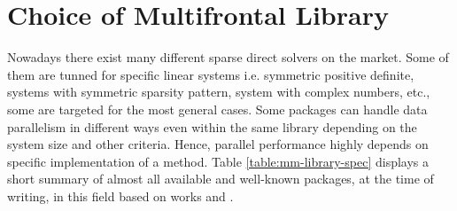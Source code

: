 \section{Choice of Multifrontal Library}
\label{subseq:mm-library-choice}



Nowadays there exist many different sparse direct solvers on the market. Some of them are tunned for specific linear systems i.e. symmetric positive definite, systems with symmetric sparsity pattern, system with complex numbers, etc., some are targeted for the most general cases. Some packages can handle data parallelism in different ways even within the same library depending on the system size and other criteria. Hence, parallel performance highly depends on specific implementation of a method. Table \ref{table:mm-library-spec} displays a short summary of almost all available and well-known packages, at the time of writing, in this field based on works \cite{list-of-sparse-direct-solvers} and \cite{petsc-web-page}.\\




